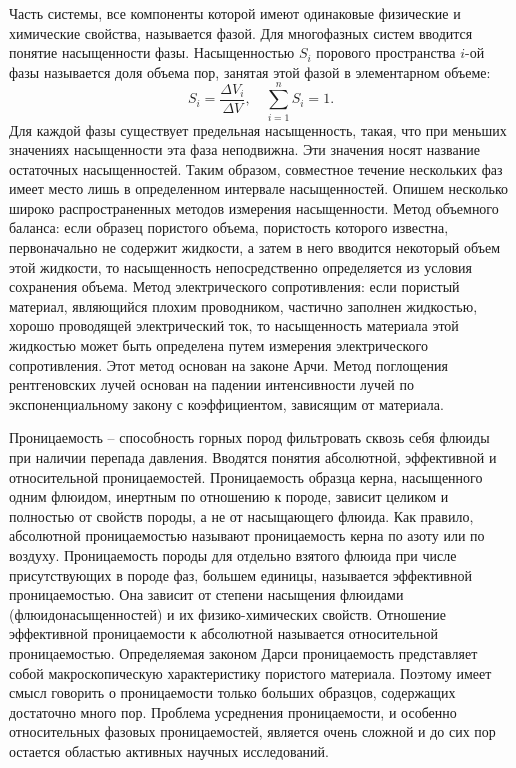 Часть системы, все компоненты которой имеют одинаковые физические и химические свойства, называется фазой.
Для многофазных систем вводится понятие насыщенности фазы. Насыщенностью $S_i$  порового пространства
$i$-ой фазы называется доля объема пор, занятая этой фазой в элементарном объеме:
\begin{equation} 
S_i=\frac{\Delta V_i}{\Delta V}, \quad \sum_{i=1}^{n}S_i=1.
\end{equation}
Для каждой фазы существует предельная насыщенность, такая, что при меньших значениях насыщенности эта фаза неподвижна. Эти значения носят название остаточных насыщенностей.
Таким образом, совместное течение нескольких фаз имеет место лишь в определенном интервале насыщенностей. Опишем несколько широко распространенных методов измерения насыщенности. Метод объемного баланса: если образец
пористого объема, пористость которого известна, первоначально не содержит жидкости, а затем в него вводится некоторый объем этой жидкости, то насыщенность непосредственно определяется из условия сохранения объема.
Метод электрического сопротивления: если пористый материал, являющийся плохим проводником, частично заполнен жидкостью, хорошо проводящей электрический ток, то насыщенность материала этой жидкостью может быть
определена путем измерения электрического сопротивления. Этот метод основан на законе Арчи. Метод поглощения рентгеновских лучей основан на падении интенсивности лучей по экспоненциальному закону с коэффициентом,
зависящим от материала.

Проницаемость -- способность горных пород фильтровать сквозь себя флюиды при наличии перепада давления. Вводятся понятия абсолютной, эффективной и относительной проницаемостей.
Проницаемость образца керна, насыщенного одним флюидом, инертным по отношению к породе, зависит целиком и полностью от свойств породы, а не от насыщающего флюида.
Как правило, абсолютной проницаемостью называют проницаемость керна по азоту или по воздуху. Проницаемость породы для отдельно взятого флюида при числе присутствующих в породе фаз, большем единицы, называется эффективной
проницаемостью. Она зависит от степени насыщения флюидами (флюидонасыщенностей) и их физико-химических свойств. Отношение эффективной проницаемости к абсолютной называется относительной проницаемостью.
Определяемая законом Дарси проницаемость представляет собой макроскопическую характеристику пористого материала. Поэтому имеет смысл говорить о проницаемости только больших образцов,
содержащих достаточно много пор. Проблема усреднения проницаемости, и особенно относительных фазовых проницаемостей, является очень сложной и до сих пор остается областью активных научных исследований.

